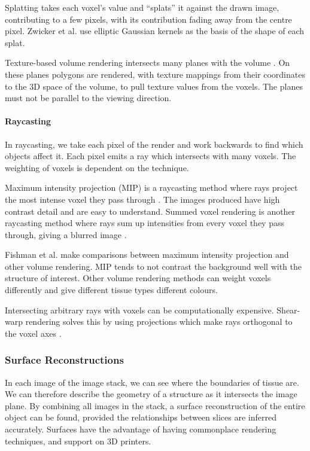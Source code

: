 \documentclass[11p, titlepage]{article}
\begin{document}
Splatting takes each voxel's value and ``splats'' it against the drawn image, contributing to a few pixels, with its contribution fading away from the centre pixel. Zwicker et al. \cite{zwicker2002ewa} use elliptic Gaussian kernels as the basis of the shape of each splat.

Texture-based volume rendering intersects many planes with the volume \cite{ohiotexture}. On these planes polygons are rendered, with texture mappings from their coordinates to the 3D space of the volume, to pull texture values from the voxels. The planes must not be parallel to the viewing direction.

\paragraph{Raycasting}

In raycasting, we take each pixel of the render and work backwards to find which objects affect it. Each pixel emits a ray which intersects with many voxels. The weighting of voxels is dependent on the technique.

Maximum intensity projection (MIP) is a raycasting method where rays project the most intense voxel they pass through \cite{birkfellner2016applied}. The images produced have high contrast detail and are easy to understand. Summed voxel rendering is another raycasting method where rays sum up intensities from every voxel they pass through, giving a blurred image \cite{birkfellner2016applied}.

Fishman et al. \cite{fishman2006volume} make comparisons between maximum intensity projection and other volume rendering. MIP tends to not contrast the background well with the structure of interest. Other volume rendering methods can weight voxels differently and give different tissue types different colours. 

Intersecting arbitrary rays with voxels can be computationally expensive. Shear-warp rendering solves this by using projections which make rays orthogonal to the voxel axes \cite{lacroute1994fast}. 

\subsubsection{Surface Reconstructions}

In each image of the image stack, we can see where the boundaries of tissue are. We can therefore describe the geometry of a structure as it intersects the image plane. By combining all images in the stack, a surface reconstruction of the entire object can be found, provided the relationships between slices are inferred accurately. Surfaces have the advantage of having commonplace rendering techniques, and support on 3D printers.
\end{document}
